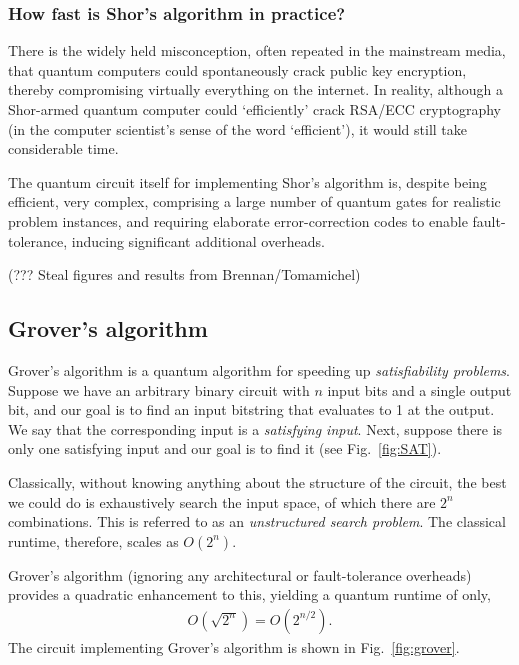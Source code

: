 \subsubsection{How fast is Shor's algorithm in practice?} \label{how-fast-is-shors-algorithm-in-practice}

There is the widely held misconception, often repeated in the mainstream media, that quantum computers could spontaneously crack public key encryption, thereby compromising virtually everything on the internet. In reality, although a Shor-armed quantum computer could `efficiently' crack RSA/ECC cryptography (in the computer scientist's sense of the word `efficient'), it would still take considerable time.

The quantum circuit itself for implementing Shor's algorithm is, despite being efficient, very complex, comprising a large number of quantum gates for realistic problem instances, and requiring elaborate error-correction codes to enable fault-tolerance, inducing significant additional overheads.

(??? Steal figures and results from Brennan/Tomamichel)

\subsection{Grover's algorithm}\label{grovers-algorithm}

Grover's algorithm \cite{bib:Grover96} is a quantum algorithm for speeding up \emph{satisfiability problems}. Suppose we have an arbitrary binary circuit with $n$ input bits and a single output bit, and our goal is to find an input bitstring that evaluates to 1 at the output. We say that the corresponding input is a \emph{satisfying input}. Next, suppose there is only one satisfying input and our goal is to find it (see Fig.~\ref{fig:SAT}).

Classically, without knowing anything about the structure of the circuit, the best we could do is exhaustively search the input space, of which there are $2^n$ combinations. This is referred to as an \emph{unstructured search problem}. The classical runtime, therefore, scales as $O(2^n)$.

Grover's algorithm (ignoring any architectural or fault-tolerance overheads) provides a quadratic enhancement to this, yielding a quantum runtime of only,
\begin{align}
    O(\sqrt{2^n}) = O(2^{n/2}).
\end{align}
The circuit implementing Grover's algorithm is shown in Fig.~\ref{fig:grover}.

